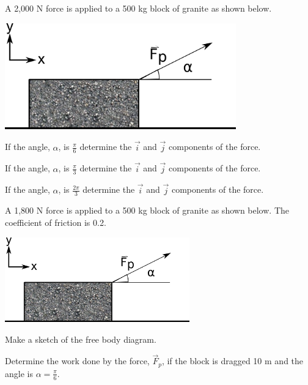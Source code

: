 


\begin{problem}
\item A 2,000 N force is applied to a 500 kg block of granite as shown
  below.

  \includegraphics[width=10cm]{ink/week7/dragBlock}

  \begin{subproblem}
  \item If the angle, $\alpha$, is $\frac{\pi}{6}$ determine the
    $\vec{i}$ and $\vec{j}$ components of the force.
    \vfill
  \item If the angle, $\alpha$, is $\frac{\pi}{3}$ determine the
    $\vec{i}$ and $\vec{j}$ components of the force.
    \vfill
  \item If the angle, $\alpha$, is $\frac{2\pi}{3}$ determine the
    $\vec{i}$ and $\vec{j}$ components of the force.
    \vfill
  \end{subproblem}

  \clearpage

\item A 1,800 N force is applied to a 500 kg block of granite as
  shown below. The coefficient of friction is 0.2.

  \includegraphics[width=8cm]{ink/week7/dragBlock}

  \begin{subproblem}
    \item Make a sketch of the free body diagram.
      \vspace{6em}
    \item Determine the work done by the force, $\vec{F}_p$, if the block is dragged
      10 m and the angle is $\alpha=\frac{\pi}{6}$.


\end{subproblem}
\end{problem}
